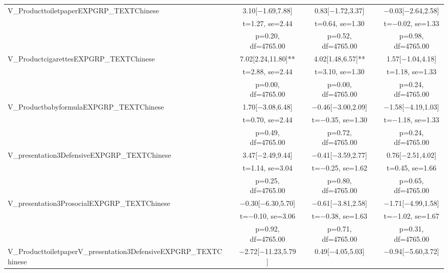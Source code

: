 \documentclass[]{report}
\begin{document}
\begin{table}
{\begin{tabular}[t]{lcccccc}
		V\_ProducttoiletpaperEXPGRP\_TEXTChinese &  & \num{3.10}[\num{-1.69},\num{7.88}] &  & \num{0.83}[\num{-1.72},\num{3.37}] &  & \num{-0.03}[\num{-2.64},\num{2.58}]\\
		&  & t=\num{1.27}, se=\num{2.44} &  & t=\num{0.64}, se=\num{1.30} &  & t=\num{-0.02}, se=\num{1.33}\\
		&  & p=\num{0.20}, df=\num{4765.00} &  & p=\num{0.52}, df=\num{4765.00} &  & p=\num{0.98}, df=\num{4765.00}\\
		V\_ProductcigarettesEXPGRP\_TEXTChinese &  & \num{7.02}[\num{2.24},\num{11.80}]** &  & \num{4.02}[\num{1.48},\num{6.57}]** &  & \num{1.57}[\num{-1.04},\num{4.18}]\\
		&  & t=\num{2.88}, se=\num{2.44} &  & t=\num{3.10}, se=\num{1.30} &  & t=\num{1.18}, se=\num{1.33}\\
		&  & p=\num{0.00}, df=\num{4765.00} &  & p=\num{0.00}, df=\num{4765.00} &  & p=\num{0.24}, df=\num{4765.00}\\
		V\_ProductbabyformulaEXPGRP\_TEXTChinese &  & \num{1.70}[\num{-3.08},\num{6.48}] &  & \num{-0.46}[\num{-3.00},\num{2.09}] &  & \num{-1.58}[\num{-4.19},\num{1.03}]\\
		&  & t=\num{0.70}, se=\num{2.44} &  & t=\num{-0.35}, se=\num{1.30} &  & t=\num{-1.18}, se=\num{1.33}\\
		&  & p=\num{0.49}, df=\num{4765.00} &  & p=\num{0.72}, df=\num{4765.00} &  & p=\num{0.24}, df=\num{4765.00}\\
		V\_presentation3DefensiveEXPGRP\_TEXTChinese &  & \num{3.47}[\num{-2.49},\num{9.44}] &  & \num{-0.41}[\num{-3.59},\num{2.77}] &  & \num{0.76}[\num{-2.51},\num{4.02}]\\
		&  & t=\num{1.14}, se=\num{3.04} &  & t=\num{-0.25}, se=\num{1.62} &  & t=\num{0.45}, se=\num{1.66}\\
		&  & p=\num{0.25}, df=\num{4765.00} &  & p=\num{0.80}, df=\num{4765.00} &  & p=\num{0.65}, df=\num{4765.00}\\
		V\_presentation3ProsocialEXPGRP\_TEXTChinese &  & \num{-0.30}[\num{-6.30},\num{5.70}] &  & \num{-0.61}[\num{-3.81},\num{2.58}] &  & \num{-1.71}[\num{-4.99},\num{1.58}]\\
		&  & t=\num{-0.10}, se=\num{3.06} &  & t=\num{-0.38}, se=\num{1.63} &  & t=\num{-1.02}, se=\num{1.67}\\
		&  & p=\num{0.92}, df=\num{4765.00} &  & p=\num{0.71}, df=\num{4765.00} &  & p=\num{0.31}, df=\num{4765.00}\\
		V\_ProducttoiletpaperV\_presentation3DefensiveEXPGRP\_TEXTChinese &  & \num{-2.72}[\num{-11.23},\num{5.79}] &  & \num{0.49}[\num{-4.05},\num{5.03}] &  & \num{-0.94}[\num{-5.60},\num{3.72}]\\

\end{tabular}}
\end{table}
\end{document}
